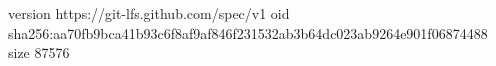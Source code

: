 version https://git-lfs.github.com/spec/v1
oid sha256:aa70fb9bca41b93c6f8af9af846f231532ab3b64dc023ab9264e901f06874488
size 87576
